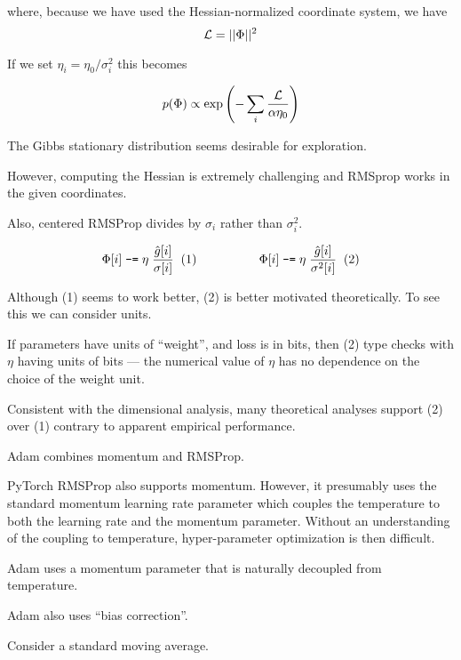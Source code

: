{\vfill
where, because we have used the Hessian-normalized coordinate system, we have 
$${\cal L} = ||\Phi||^2$$


If we set $\eta_i = \eta_0/\sigma_i^2$ this becomes

$$p(\Phi) \propto \exp\left(-\sum_i \frac{{\cal L}}{\alpha\eta_0}\right)$$

\vfill
The Gibbs stationary distribution seems desirable for exploration.


However, computing the Hessian is extremely challenging and RMSprop works in the given coordinates.

\vfill
Also, centered RMSProp divides by $\sigma_i$ rather than $\sigma_i^2$.


{\color{red} $$\Phi[i] \;\mbox{\tt -=} \; \eta\;\frac{\hat{g}[i]}{\sigma[i]}\;\;(1)\hspace{5em}\Phi[i] \;\mbox{\tt -=} \; \eta\;\frac{\hat{g}[i]}{\sigma^2[i]}\;\;(2)$$}

\vfill
Although (1) seems to work better, (2) is better motivated theoretically.  To see this we can consider units.

\vfill
If parameters have units of ``weight'', and loss is in bits, then (2) type checks with $\eta$ having units of bits --- the numerical value of $\eta$
has no dependence on the choice of the weight unit.

\vfill
Consistent with the dimensional analysis, many theoretical analyses support (2) over (1) contrary to apparent empirical performance.


Adam combines momentum and RMSProp.

\vfill
PyTorch RMSProp also supports momentum.  However, it presumably uses the standard momentum learning rate parameter which couples the temperature to both
the learning rate and the momentum parameter.  Without an understanding of the coupling to temperature, hyper-parameter optimization is then difficult.

\vfill
Adam uses a momentum parameter that is naturally decoupled from temperature.

\vfill
Adam also uses ``bias correction''.


Consider a standard moving average.

}
